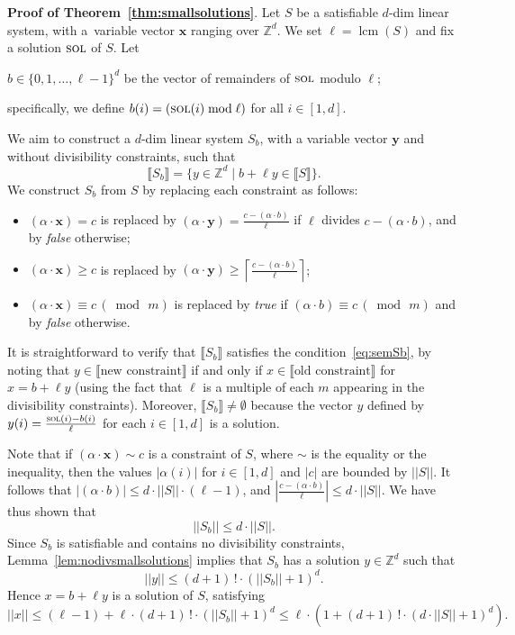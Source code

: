 \documentclass[11pt,a4paper]{amsart}
\newcommand{\sol}{\textsc{sol}}
\newcommand{\bvar}[1]{\mathbf{#1}}
\newcommand{\nnorm}[1]{||#1||}
\newcommand{\Zset}{\mathbb{Z}}
\newcommand{\setZ}{\Zset}
\newcommand{\scalar}[2]{(#1 \cdot #2)}
\newcommand{\sem}[1]{\llbracket#1\rrbracket}
\newcommand{\mlcm}[1]{\operatorname{lcm}(#1)}
\let\origtextsc\textsc
\renewcommand{\textsc}[1]{\textnormal{\origtextsc{#1}}}
\theoremstyle{plain}
\theoremstyle{definition}
\theoremstyle{defC}
\theoremstyle{thmC}
\begin{document}
\noindent
\textbf{Proof of Theorem~\ref{thm:smallsolutions}}. 
Let $S$ be a satisfiable $d$-dim linear system, with a~variable vector
$\bvar{x}$ ranging over $\setZ^d$. We set
$\ell=\mlcm{S}$ and fix a solution $\sol$ of $S$.
Let 
\begin{center}
$b\in \{0,1,\dots,\ell{-}1\}^d$ be the vector of remainders of
	$\sol$ modulo $\ell$;
\end{center}
specifically, we define $b(i)=(\sol(i)\bmod\ell)$ for all $i\in[1,d]$. 

We aim to construct a $d$-dim linear system $S_b$, with a variable
vector
$\bvar{y}$ and without divisibility constraints, such that 
\begin{equation}\label{eq:semSb}
\sem{S_b}=\{y\in \setZ^d\mid b+\ell y\in\sem{S}\}.
\end{equation}
We construct $S_b$ from $S$ by replacing each constraint as follows:
  \begin{itemize}
  \item $\scalar{\alpha}{\bvar{x}}=c$ is replaced by 
	  $\scalar{\alpha}{\bvar{y}}=\frac{c-\scalar{\alpha}{b}}{\ell}$
		  if $\ell$ divides $c-\scalar{\alpha}{b}$, and by
		  \emph{false} otherwise;
  \item $\scalar{\alpha}{\bvar{x}}\geq c$ is replaced by
	  $\scalar{\alpha}{\bvar{y}}\geq  \left
		  \lceil{\frac{c-\scalar{\alpha}{b}}{\ell}}\right
		  \rceil$;
  \item $\scalar{\alpha}{\bvar{x}}\equiv c\,(\bmod\, m)$ is replaced
	  by \emph{true} if
		  $\scalar{\alpha}{b}\equiv c\,(\bmod\, m)$ and by
		  \emph{false}
		  otherwise.
  \end{itemize}

\noindent
It is straightforward to verify that $\sem{S_b}$ satisfies the 
condition~\eqref{eq:semSb}, by noting that $y\in\sem{\text{new
constraint}}$ if and only if
$x\in\sem{\text{old constraint}}$ for $x=b+\ell y$
(using the fact that $\ell$ is a multiple of each $m$ appearing in the
divisibility constraints).
Moreover, $\sem{S_b}\neq\emptyset$ because the vector $y$ defined by 
$y(i)=\frac{\sol(i)-b(i)}{\ell}$ for each $i\in[1,d]$ is a solution.


Note that if $\scalar{\alpha}{\bvar{x}}\sim c$ is a constraint of
$S$, where $\sim$ is the equality or the inequality, then
the values $|\alpha(i)|$ for $i\in[1,d]$ and $|c|$ are bounded by
$\nnorm{S}$. It follows that
$|\scalar{\alpha}{b}|\leq d\cdot\nnorm{S}\cdot(\ell-1)$, and 
 $|\frac{c-\scalar{\alpha}{b}}{\ell}|\leq
d\cdot\nnorm{S}$. We have thus shown that 
\[\nnorm{S_b}\leq d\cdot\nnorm{S}.\] 
Since $S_b$ is satisfiable and contains no divisibility constraints, 
Lemma~\ref{lem:nodivsmallsolutions} implies that $S_b$ has a solution
$y\in\setZ^d$ such that 
\[\nnorm{y}\leq (d+1)\,!\cdot(\nnorm{S_b}+1)^d.\]
Hence $x=b+\ell y$
is a solution of $S$, satisfying
\[\nnorm{x}\leq (\ell-1) +\ell\cdot (d+1)\,!\cdot(\nnorm{S_b}+1)^d\leq
	\ell\cdot\left(1+ (d+1)\,!\cdot(d\cdot \nnorm{S}+1)^d\right).\tag*{\qed}\]
\end{document}
